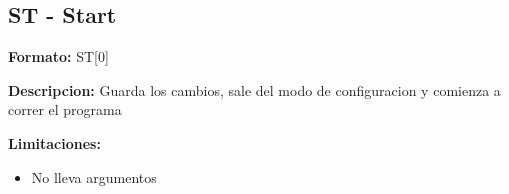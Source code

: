 
\subsection{ST - Start} %
\label{sub:st_start}


\textbf{Formato:} ST[0]

\textbf{Descripcion:}
Guarda los cambios, sale del modo de configuracion y comienza a correr el programa

\textbf{Limitaciones:}
\begin{itemize}
  \item No lleva argumentos
\end{itemize}

